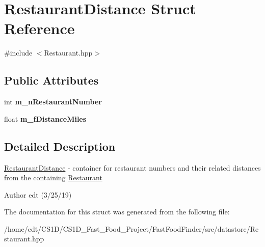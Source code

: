\hypertarget{structRestaurantDistance}{\section{Restaurant\-Distance Struct Reference}
\label{structRestaurantDistance}
}


{\ttfamily \#include $<$Restaurant.\-hpp$>$}

\subsection*{Public Attributes}
\begin{DoxyCompactItemize}
\item 
\hypertarget{structRestaurantDistance_afb739d6fb9ec442a677862441661e72a}{int {\bfseries m\-\_\-n\-Restaurant\-Number}}\label{structRestaurantDistance_afb739d6fb9ec442a677862441661e72a}

\item 
\hypertarget{structRestaurantDistance_a075d62cf404beeb176b00e99477aecc2}{float {\bfseries m\-\_\-f\-Distance\-Miles}}\label{structRestaurantDistance_a075d62cf404beeb176b00e99477aecc2}

\end{DoxyCompactItemize}


\subsection{Detailed Description}
\hyperlink{structRestaurantDistance}{Restaurant\-Distance} -\/ container for restaurant numbers and their related distances from the containing \hyperlink{classRestaurant}{Restaurant}

\begin{DoxyAuthor}{Author}
edt (3/25/19) 
\end{DoxyAuthor}


The documentation for this struct was generated from the following file\-:\begin{DoxyCompactItemize}
\item 
/home/edt/\-C\-S1\-D/\-C\-S1\-D\-\_\-\-Fast\-\_\-\-Food\-\_\-\-Project/\-Fast\-Food\-Finder/src/datastore/Restaurant.\-hpp\end{DoxyCompactItemize}
